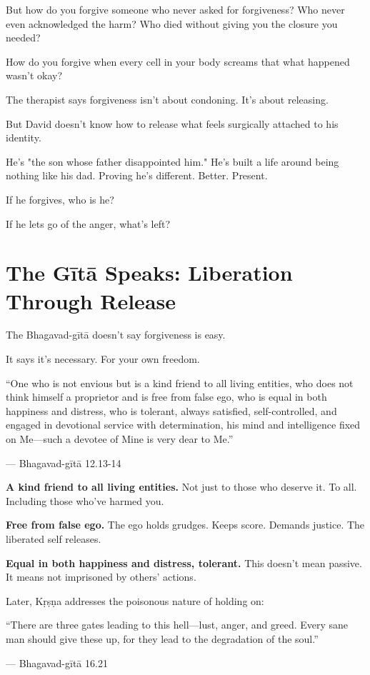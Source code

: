 \documentclass[11pt,twoside]{book}
\begin{document}
But how do you forgive someone who never asked for forgiveness? Who never even acknowledged the harm? Who died without giving you the closure you needed?

How do you forgive when every cell in your body screams that what happened wasn't okay?

The therapist says forgiveness isn't about condoning. It's about releasing.

But David doesn't know how to release what feels surgically attached to his identity.

He's "the son whose father disappointed him." He's built a life around being nothing like his dad. Proving he's different. Better. Present.

If he forgives, who is he?

If he lets go of the anger, what's left?

\section*{The Gītā Speaks: Liberation Through Release}

The Bhagavad-gītā doesn't say forgiveness is easy.

It says it's necessary. For your own freedom.

\begin{pullquote}
``One who is not envious but is a kind friend to all living entities, who does not think himself a proprietor and is free from false ego, who is equal in both happiness and distress, who is tolerant, always satisfied, self-controlled, and engaged in devotional service with determination, his mind and intelligence fixed on Me—such a devotee of Mine is very dear to Me.''

--- Bhagavad-gītā 12.13-14
\end{pullquote}

\textbf{\textbf{A kind friend to all living entities.}} Not just to those who deserve it. To all. Including those who've harmed you.

\textbf{\textbf{Free from false ego.}} The ego holds grudges. Keeps score. Demands justice. The liberated self releases.

\textbf{\textbf{Equal in both happiness and distress, tolerant.}} This doesn't mean passive. It means not imprisoned by others' actions.

Later, Kṛṣṇa addresses the poisonous nature of holding on:

\begin{pullquote}
``There are three gates leading to this hell—lust, anger, and greed. Every sane man should give these up, for they lead to the degradation of the soul.''

--- Bhagavad-gītā 16.21
\end{pullquote}
\end{document}
